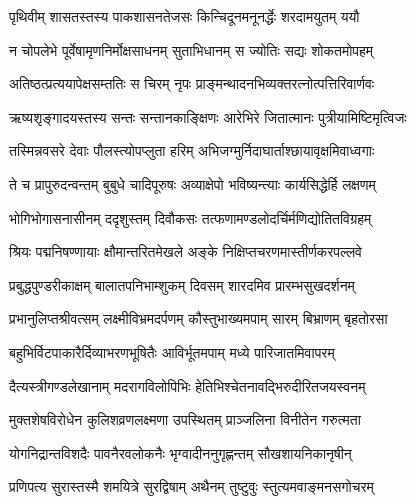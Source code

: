 
\storymeta


\twolineshloka
{पृथिवीम् शासतस्तस्य पाकशासनतेजसः}
{किन्चिदूनमनूनर्द्धेः शरदामयुतम् ययौ} %

\twolineshloka
{न चोपलेभे पूर्वेषामृणनिर्मोक्षसाधनम्}
{सुताभिधानम् स ज्योतिः सद्यः शोकतमोपहम्} %

\twolineshloka
{अतिष्ठत्प्रत्ययापेक्षसम्ततिः स चिरम् नृपः}
{प्राङ्मन्थादनभिव्यक्तरत्नोत्पत्तिरिवार्णवः} %

\twolineshloka
{ऋष्यशृङ्गादयस्तस्य सन्तः सन्तानकाङ्क्षिणः}
{आरेभिरे जितात्मानः पुत्रीयामिष्टिमृत्विजः} %

\twolineshloka
{तस्मिन्नवसरे देवाः पौलस्त्योपप्लुता हरिम्}
{अभिजग्मुर्निदाघार्ताश्छायावृक्षमिवाध्वगाः} %

\twolineshloka
{ते च प्रापुरुदन्वन्तम् बुबुधे चादिपूरुषः}
{अव्याक्षेपो भविष्यन्त्याः कार्यसिद्धेर्हि लक्षणम्} %

\twolineshloka
{भोगिभोगासनासीनम् ददृशुस्तम् दिवौकसः}
{तत्फणामण्डलोदर्चिर्मणिद्योतितविग्रहम्} %

\twolineshloka
{श्रियः पद्मनिषण्णायाः क्षौमान्तरितमेखले}
{अङ्के निक्षिप्तचरणमास्तीर्णकरपल्लवे} %

\twolineshloka
{प्रबुद्धपुण्डरीकाक्षम् बालातपनिभाम्शुकम्}
{दिवसम् शारदमिव प्रारम्भसुखदर्शनम्} %

\twolineshloka
{प्रभानुलिप्तश्रीवत्सम् लक्ष्मीविभ्रमदर्पणम्}
{कौस्तुभाख्यमपाम् सारम् बिभ्राणम् बृहतोरसा} %

\twolineshloka
{बहुभिर्विटपाकारैर्दिव्याभरणभूषितैः}
{आविर्भूतमपाम् मध्ये पारिजातमिवापरम्} %

\twolineshloka
{दैत्यस्त्रीगण्डलेखानाम् मदरागविलोपिभिः}
{हेतिभिश्चेतनावद्भिरुदीरितजयस्वनम्} %

\twolineshloka
{मुक्तशेषविरोधेन कुलिशव्रणलक्ष्मणा}
{उपस्थितम् प्राञ्जलिना विनीतेन गरुत्मता} %

\twolineshloka
{योगनिद्रान्तविशदैः पावनैरवलोकनैः}
{भृग्वादीननुगृह्णन्तम् सौखशायनिकानृषीन्} %

\twolineshloka
{प्रणिपत्य सुरास्तस्मै शमयित्रे सुरद्विषाम्}
{अथैनम् तुष्टुवुः स्तुत्यमवाङ्मनसगोचरम्} %

